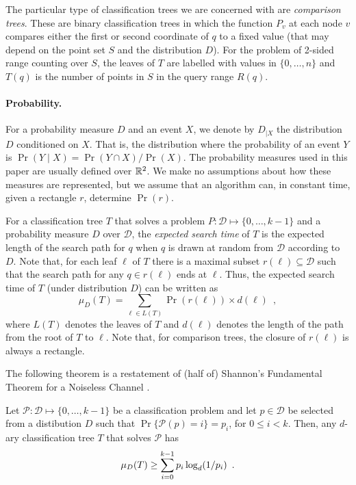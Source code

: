 \documentclass[lotsofwhite,charterfonts]{patmorin}
\newcommand{\depth}{d}
\begin{document}
The particular type of classification trees we are concerned with are
\emph{comparison trees}.  These are binary classification trees in
which the function $P_v$ at each node $v$ compares either the first or
second coordinate of $q$ to a fixed value (that may depend on the
point set $S$ and the distribution $D$).  For the problem of 2-sided
range counting over $S$, the leaves of $T$ are labelled with values in
$\{0,\ldots,n\}$ and $T(q)$ is the number of points in $S$ in
the query range $R(q)$.


\paragraph{Probability.}

For a probability measure $D$ and an event $X$, we denote by $D_{|X}$ the
distribution $D$ conditioned on $X$.  That is, the distribution where
the probability of an event $Y$ is $\Pr(Y\mid X)=\Pr(Y\cap X)/\Pr(X)$.
The probability measures used in this paper are usually defined over
$\mathbb{R}^2$.  We make no assumptions about how these measures are
represented, but we assume that an algorithm can, in constant time,
given a rectangle $r$, determine $\Pr(r)$.

For a classification tree $T$ that solves a problem
$P:\mathcal{D}\mapsto\{0,\ldots,k-1\}$ and a probability measure $D$
over $\mathcal{D}$, the \emph{expected search time} of $T$ is the
expected length of the search path for $q$ when $q$ is drawn at random
from $\mathcal{D}$ according to $D$.  Note that, for each leaf $\ell$
of $T$ there is a maximal subset $r(\ell)\subseteq \mathcal{D}$ such
that the search path for any $q\in r(\ell)$ ends at $\ell$.  Thus, the
expected search time of $T$ (under distribution $D$) can be written as
\[
     \mu_D(T) = \sum_{\ell\in L(T)} \Pr(r(\ell))\times \depth(\ell)
	\enspace ,
\]
where $L(T)$ denotes the leaves of $T$ and $\depth(\ell)$ denotes the
length of the path from the root of $T$ to $\ell$.  Note that, for comparison
trees, the closure of $r(\ell)$ is always a rectangle.

The following theorem is a restatement of (half of) Shannon's
Fundamental Theorem for a Noiseless Channel \cite[Theorem 9]{s48}.

\begin{thm}
Let $\mathcal{P}:\mathcal{D}\mapsto \{0,\ldots,k-1\}$ be a classification
problem and let $p\in \mathcal{D}$ be selected from a distibution $D$ such
that $\Pr\{\mathcal{P}(p)= i\}=p_i$, for $0\le i< k$.  Then, any
$d$-ary classification tree $T$ that solves $\mathcal{P}$ has
\begin{equation}
     \mu_D(T) \ge \sum_{i=0}^{k-1} p_i\log_d(1/p_i) \enspace .
	\eqlabel{shannon}
\end{equation}
\end{thm}
\end{document}
